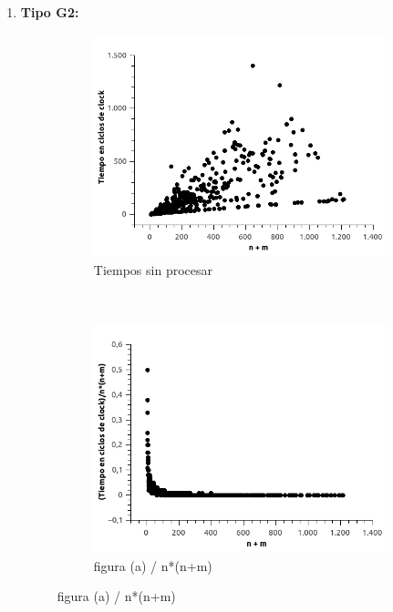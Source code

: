 \begin{enumerate}
\begin{figure}[H]
\end{figure}



\item \textbf{Tipo G2:}

\begin{figure}[H]
        \centering
        \begin{subfigure}[b]{0.5\textwidth}
                \includegraphics[width=\textwidth]{imagenes/ejer4-grafG2-1.jpg}
                \caption{Tiempos sin procesar}
        \end{subfigure}%
        ~ %
        \begin{subfigure}[b]{0.5\textwidth}
                \includegraphics[width=\textwidth]{imagenes/ejer4-grafG2-2.jpg}
                \caption{figura (a) / n*(n+m)}
        \end{subfigure}
        
\end{figure}


\end{enumerate}

